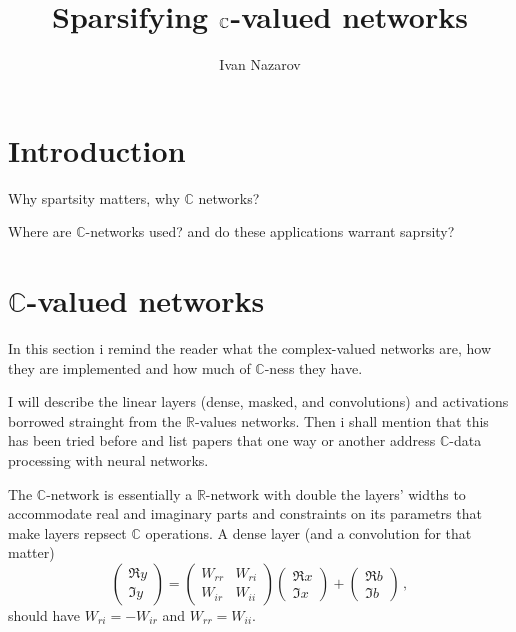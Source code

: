 \documentclass[a4paper,10pt]{article}
\title{Sparsifying $\cplx$-valued networks}
\author{Ivan Nazarov}
\newcommand{\real}{\mathbb{R}}
\newcommand{\cplx}{\mathbb{C}}
\begin{document}
\maketitle


\section{Introduction} %
\label{sec:introduction}

Why spartsity matters, why $\cplx$ networks?

Where are $\cplx$-networks used? and do these applications warrant saprsity?


\section{$\cplx$-valued networks} %
\label{sec:c_valued_networks}

In this section i remind the reader what the complex-valued networks are, how
they are implemented and how much of $\cplx$-ness they have.

I will describe the linear layers (dense, masked, and convolutions) and
activations borrowed strainght from the $\real$-values networks. Then i shall
mention that this has been tried before and list papers that one way or another
address $\cplx$-data processing with neural networks.
\cite{trabelsi_deep_2017}

The $\cplx$-network is essentially a $\real$-network with double the layers' widths
to accommodate real and imaginary parts and constraints on its parametrs that make
layers repsect $\cplx$ operations. A dense layer (and a convolution for that matter)
$$
  \begin{pmatrix}
    \Re y \\ \Im y
  \end{pmatrix}
    = \begin{pmatrix}
      W_{rr} & W_{ri} \\ 
      W_{ir} & W_{ii}
    \end{pmatrix}
    \begin{pmatrix}
      \Re x \\ \Im x
    \end{pmatrix}
    + \begin{pmatrix}
      \Re b \\ \Im b
    \end{pmatrix}
  \,, $$
should have $W_{ri} = - W_{ir}$ and $W_{rr} = W_{ii}$.
\end{document}
